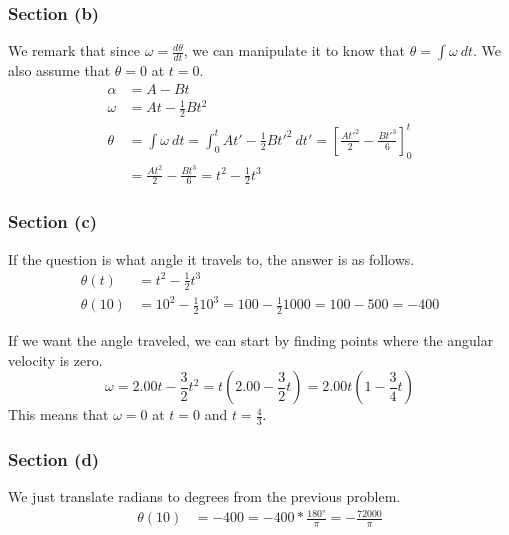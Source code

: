 \documentclass[12pt]{article}
\begin{document}
\subsubsection*{Section (b)}
We remark that since $\omega = \frac{d\theta}{dt}$, we can manipulate it to know that $\theta = \int \omega\ dt$. We also assume that $\theta = 0$ at $t = 0$.
\begin{align*}
    \alpha  &=  A - Bt\\
    \omega  &=  At - \frac{1}{2}Bt^2\\
    \theta  &=  \int \omega\ dt
            =   \int_{0}^{t} At' - \frac{1}{2}Bt'^2\ dt'
            =   \left[\frac{At'^2}{2} - \frac{Bt'^3}{6}\right]_0^t\\
            &=  \frac{At^2}{2} - \frac{Bt^3}{6}
            =   \boxed{t^2 - \frac{1}{2}t^3}
\end{align*}

\pagebreak
\subsubsection*{Section (c)}
If the question is what angle it travels to, the answer is as follows.
\begin{align*}
    \theta(t)   &=  t^2 - \frac{1}{2}t^3\\
    \theta(10)  &=  10^2 - \frac{1}{2}10^3
        =   100 - \frac{1}{2}1000
        =   100 - 500
        =   \boxed{-400}
\end{align*}

If we want the angle traveled, we can start by finding points where the angular velocity is zero. 
\[ \omega = 2.00t - \frac{3}{2}t^2 = t(2.00 - \frac{3}{2}t) = 2.00t(1 - \frac{3}{4}t) \]
This means that $\omega = 0$ at $t = 0$ and $t = \frac{4}{3}$. 

\subsubsection*{Section (d)}
We just translate radians to degrees from the previous problem.
\begin{align*}
    \theta(10)  &=  -400
        =   -400 * \frac{180\unit{\degree}}{\pi}
        =   -\frac{72000}{\pi}
\end{align*}
\end{document}
